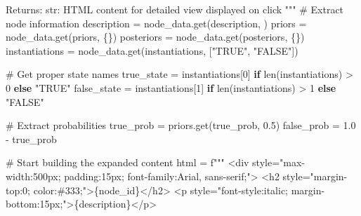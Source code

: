 \documentclass[
  11pt,
  letterpaper,
]{book}
\newenvironment{Shaded}{\begin{snugshade}}{\end{snugshade}}
\newcommand{\BuiltInTok}[1]{\textcolor[rgb]{0.00,0.23,0.31}{#1}}
\newcommand{\CommentTok}[1]{\textcolor[rgb]{0.37,0.37,0.37}{#1}}
\newcommand{\ControlFlowTok}[1]{\textcolor[rgb]{0.00,0.23,0.31}{\textbf{#1}}}
\newcommand{\DecValTok}[1]{\textcolor[rgb]{0.68,0.00,0.00}{#1}}
\newcommand{\FloatTok}[1]{\textcolor[rgb]{0.68,0.00,0.00}{#1}}
\newcommand{\NormalTok}[1]{\textcolor[rgb]{0.00,0.23,0.31}{#1}}
\newcommand{\OperatorTok}[1]{\textcolor[rgb]{0.37,0.37,0.37}{#1}}
\newcommand{\SpecialCharTok}[1]{\textcolor[rgb]{0.37,0.37,0.37}{#1}}
\newcommand{\SpecialStringTok}[1]{\textcolor[rgb]{0.13,0.47,0.30}{#1}}
\newcommand{\StringTok}[1]{\textcolor[rgb]{0.13,0.47,0.30}{#1}}
\begin{document}
\begin{Shaded}
\begin{Highlighting}[]
\CommentTok{    Returns:}
\CommentTok{        str: HTML content for detailed view displayed on click}
\CommentTok{    """}
    \CommentTok{\# Extract node information}
\NormalTok{    description }\OperatorTok{=}\NormalTok{ node\_data.get(}\StringTok{\textquotesingle{}description\textquotesingle{}}\NormalTok{, }\StringTok{\textquotesingle{}\textquotesingle{}}\NormalTok{)}
\NormalTok{    priors }\OperatorTok{=}\NormalTok{ node\_data.get(}\StringTok{\textquotesingle{}priors\textquotesingle{}}\NormalTok{, \{\})}
\NormalTok{    posteriors }\OperatorTok{=}\NormalTok{ node\_data.get(}\StringTok{\textquotesingle{}posteriors\textquotesingle{}}\NormalTok{, \{\})}
\NormalTok{    instantiations }\OperatorTok{=}\NormalTok{ node\_data.get(}\StringTok{\textquotesingle{}instantiations\textquotesingle{}}\NormalTok{, [}\StringTok{"TRUE"}\NormalTok{, }\StringTok{"FALSE"}\NormalTok{])}

    \CommentTok{\# Get proper state names}
\NormalTok{    true\_state }\OperatorTok{=}\NormalTok{ instantiations[}\DecValTok{0}\NormalTok{] }\ControlFlowTok{if} \BuiltInTok{len}\NormalTok{(instantiations) }\OperatorTok{\textgreater{}} \DecValTok{0} \ControlFlowTok{else} \StringTok{"TRUE"}
\NormalTok{    false\_state }\OperatorTok{=}\NormalTok{ instantiations[}\DecValTok{1}\NormalTok{] }\ControlFlowTok{if} \BuiltInTok{len}\NormalTok{(instantiations) }\OperatorTok{\textgreater{}} \DecValTok{1} \ControlFlowTok{else} \StringTok{"FALSE"}

    \CommentTok{\# Extract probabilities}
\NormalTok{    true\_prob }\OperatorTok{=}\NormalTok{ priors.get(}\StringTok{\textquotesingle{}true\_prob\textquotesingle{}}\NormalTok{, }\FloatTok{0.5}\NormalTok{)}
\NormalTok{    false\_prob }\OperatorTok{=} \FloatTok{1.0} \OperatorTok{{-}}\NormalTok{ true\_prob}

    \CommentTok{\# Start building the expanded content}
\NormalTok{    html }\OperatorTok{=} \SpecialStringTok{f"""}
\SpecialStringTok{    \textless{}div style="max{-}width:500px; padding:15px; font{-}family:Arial, sans{-}serif;"\textgreater{}}
\SpecialStringTok{        \textless{}h2 style="margin{-}top:0; color:\#333;"\textgreater{}}\SpecialCharTok{\{}\NormalTok{node\_id}\SpecialCharTok{\}}\SpecialStringTok{\textless{}/h2\textgreater{}}
\SpecialStringTok{        \textless{}p style="font{-}style:italic; margin{-}bottom:15px;"\textgreater{}}\SpecialCharTok{\{}\NormalTok{description}\SpecialCharTok{\}}\SpecialStringTok{\textless{}/p\textgreater{}}


\end{Highlighting}
\end{Shaded}
\end{document}
